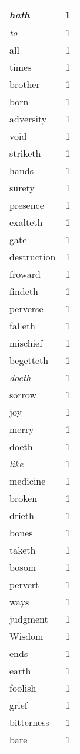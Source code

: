 \begin{center}
\begin{longtable}{l|r}
\emph{hath} & 1\\ \hline 
\emph{to} & 1\\ \hline 
all & 1\\ \hline 
times & 1\\ \hline 
brother & 1\\ \hline 
born & 1\\ \hline 
adversity & 1\\ \hline 
void & 1\\ \hline 
striketh & 1\\ \hline 
hands & 1\\ \hline 
surety & 1\\ \hline 
presence & 1\\ \hline 
exalteth & 1\\ \hline 
gate & 1\\ \hline 
destruction & 1\\ \hline 
froward & 1\\ \hline 
findeth & 1\\ \hline 
perverse & 1\\ \hline 
falleth & 1\\ \hline 
mischief & 1\\ \hline 
begetteth & 1\\ \hline 
\emph{doeth} & 1\\ \hline 
sorrow & 1\\ \hline 
joy & 1\\ \hline 
merry & 1\\ \hline 
doeth & 1\\ \hline 
\emph{like} & 1\\ \hline 
medicine & 1\\ \hline 
broken & 1\\ \hline 
drieth & 1\\ \hline 
bones & 1\\ \hline 
taketh & 1\\ \hline 
bosom & 1\\ \hline 
pervert & 1\\ \hline 
ways & 1\\ \hline 
judgment & 1\\ \hline 
Wisdom & 1\\ \hline 
ends & 1\\ \hline 
earth & 1\\ \hline 
foolish & 1\\ \hline 
grief & 1\\ \hline 
bitterness & 1\\ \hline 
bare & 1\\ \hline 

\end{longtable}
\end{center}
